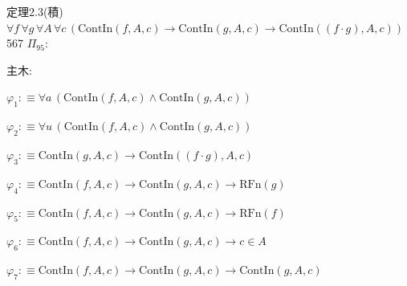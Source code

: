 \begin{fullproof}{定理2.3(積)}{$\forall f\,\forall g\,\forall A\,\forall c\,(\mathrm{ContIn}(f,A,c) \to \mathrm{ContIn}(g,A,c) \to \mathrm{ContIn}((f \cdot g),A,c))$}{567}
\noindent$\Pi_{95}$:
\begin{ptree}
\noLine
{}
\noLine
{}
\noLine
{}
\end{ptree}
\noindent 主木:
\begin{ptree}
\noLine
{}
\noLine
{}
\end{ptree}
\begin{abbrevlist}
\item $\varphi_{1} :\equiv \forall a\,(\mathrm{ContIn}(f,A,c) \land \mathrm{ContIn}(g,A,c))$
\item $\varphi_{2} :\equiv \forall u\,(\mathrm{ContIn}(f,A,c) \land \mathrm{ContIn}(g,A,c))$
\item $\varphi_{3} :\equiv \mathrm{ContIn}(g,A,c) \to \mathrm{ContIn}((f \cdot g),A,c)$
\item $\varphi_{4} :\equiv \mathrm{ContIn}(f,A,c) \to \mathrm{ContIn}(g,A,c) \to \mathrm{RFn}(g)$
\item $\varphi_{5} :\equiv \mathrm{ContIn}(f,A,c) \to \mathrm{ContIn}(g,A,c) \to \mathrm{RFn}(f)$
\item $\varphi_{6} :\equiv \mathrm{ContIn}(f,A,c) \to \mathrm{ContIn}(g,A,c) \to c \in A$
\item $\varphi_{7} :\equiv \mathrm{ContIn}(f,A,c) \to \mathrm{ContIn}(g,A,c) \to \mathrm{ContIn}(g,A,c)$

\end{abbrevlist}
\end{fullproof}
